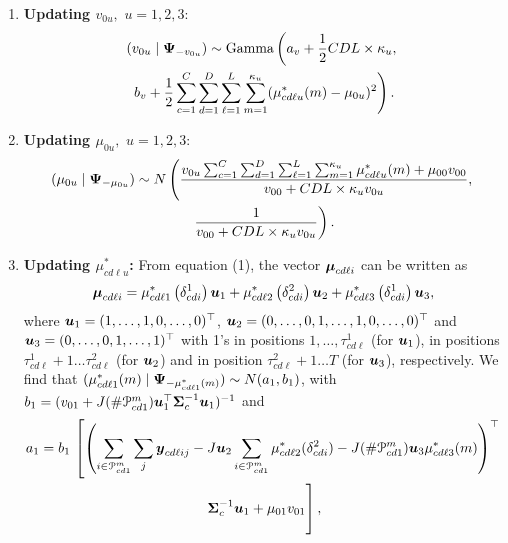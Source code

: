 \begin{enumerate}
\item {\bf Updating $v_{0u},$} $ u = 1, 2, 3$:
  \begin{multline*}
  (v_{0u} \mid \mbox{\boldmath $\Psi$}_{-v_{0u}}) \sim \mbox{Gamma}\left(a_v + \frac{1}{2}CDL
  \times \kappa_{u}, \right.  \\
  \left. b_v + \frac{1}{2}\sum^C_{c=1} \sum^D_{d=1}
  \sum^L_{\ell=1} \sum^{\kappa_u}_{m=1}(\mu^*_{cd\ell u}(m) -
  \mu_{0u})^2\right).
  \end{multline*}

\item {\bf Updating $\mu_{0u},$} $u = 1, 2, 3$:
  \begin{multline*}
  (\mu_{0u} \mid \bfPsi_{-\mu_{0u}}) \sim N\left(\frac{ v_{0u}\sum^C_{c=1}
  \sum^{D}_{d=1} \sum^L_{\ell=1} \sum^{\kappa_{u}}_{m=1} \mu^*_{cd\ell
    u}(m) + \mu_{00}v_{00} }{ v_{00} + CDL \times \kappa_{u} v_{0u} },
  \right. \\
  \left. \frac{1}{ v_{00} + CDL \times \kappa_{u} v_{0u} }\right).$$
\end{multline*}

\item {\bf Updating $\mu^*_{cd \ell u}$: }
From equation (1), the vector $\mbox{\boldmath $\mu$}_{cd\ell i}$ can be written as
$$
\mbox{\boldmath $\mu$}_{cd\ell i} = \mu^*_{cd\ell 1}\left(\delta^1_{cdi}\right)\mbox{\boldmath $u$}_1 +
\mu^*_{cd\ell 2}\left(\delta^2_{cdi}\right)\mbox{\boldmath $u$}_2 + \mu^*_{cd\ell
  3}\left(\delta^1_{cdi}\right)\mbox{\boldmath $u$}_3,
$$
where
$\mbox{\boldmath $u$}_1 = (1, \ldots, 1, 0, \ldots, 0)^{\top}$,
$\mbox{\boldmath $u$}_2 = (0, \ldots, 0, 1, \ldots, 1, 0, \ldots, 0)^{\top}$
           and
$\mbox{\boldmath $u$}_3 = (0, \ldots, 0,\\ 1, \ldots, 1)^{\top}$
with 1's in positions $1,\ldots,\tau^1_{cd\ell}$ (for $\mbox{\boldmath $u$}_1$),
in positions $\tau^1_{cd\ell}+1 \ldots \tau^2_{cd\ell}$ (for $\mbox{\boldmath $u$}_2$) and
in position $\tau^2_{cd\ell} + 1 \ldots T$ (for $\mbox{\boldmath $u$}_3$), respectively.
We find that $(\mu^*_{cd\ell 1}(m) \mid \mbox{\boldmath $\Psi$}_{-\mu^*_{cd\ell 1}(m)}) \sim N(a_1, b_1)$, with
$b_1 = (v_{01} + J (\#\mathcal{P}^m_{cd1}) \mbox{\boldmath $u$}_1^{\top}\mbox{\boldmath $\Sigma$}^{-1}_c
\mbox{\boldmath $u$}_1)^{-1}$
and
\begin{multline*}
  a_1 = b_1\, \left[\left(\sum_{i \in \mathcal{P}^m_{cd1}}\sum_j
    \bfy_{cd\ell ij} - J\bfu_2
    \sum_{i \in  \mathcal{P}^m_{cd1}}\mu^*_{cd\ell 2}(\delta^2_{cdi}) -
    J(\#\mathcal{P}^m_{cd1}) \bfu_3 \mu^*_{cd\ell 3}(m) \right)^{\top} \right. \\
    \left.\vphantom{\sum_{i \in  \mathcal{P}^m_{cd1}}} \bfSigma^{-1}_c \bfu_1 + \mu_{01}v_{01} \right],
\end{multline*}
    

\end{enumerate}
